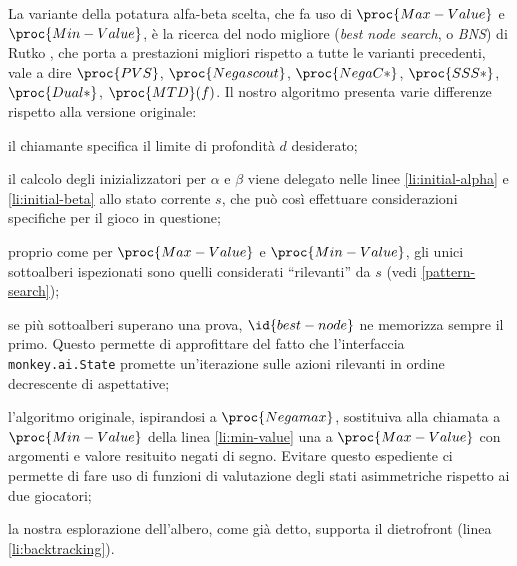 \documentclass{article}
\begin{document}
La variante della potatura alfa-beta scelta, che fa uso di $\proc{Max-Value}$ e
$\proc{Min-Value}$, è la ricerca del nodo migliore (\emph{best node search}, o
\emph{BNS}) di Rutko \cite{edseul.200009163084620110101}, che porta a
prestazioni migliori rispetto a tutte le varianti precedenti, vale a dire
$\proc{PVS}$, $\proc{Negascout}$, $\proc{NegaC*}$, $\proc{SSS*}$,
$\proc{Dual*}$, $\proc{MTD}(f)$. Il nostro algoritmo presenta varie differenze
rispetto alla versione originale:
\begin{itemize}
    \item il chiamante specifica il limite di profondità $d$ desiderato;
    \item il calcolo degli inizializzatori per $\alpha$ e $\beta$ viene delegato
      nelle linee \ref{li:initial-alpha} e \ref{li:initial-beta} allo stato
      corrente $s$, che può così effettuare considerazioni specifiche per il
      gioco in questione;
    \item proprio come per $\proc{Max-Value}$ e $\proc{Min-Value}$, gli unici
      sottoalberi ispezionati sono quelli considerati ``rilevanti'' da $s$ (vedi
      \ref{pattern-search});
    \begin{sloppypar}
    \item se più sottoalberi superano una prova, $\id{best-node}$ ne memorizza
      sempre il primo. Questo permette di approfittare del fatto che
      l'interfaccia \verb!monkey.ai.State! promette un'iterazione sulle azioni
      rilevanti in ordine decrescente di aspettative;
    \end{sloppypar}
    \item l'algoritmo originale, ispirandosi a $\proc{Negamax}$, sostituiva alla
      chiamata a $\proc{Min-Value}$ della linea \ref{li:min-value} una a
      $\proc{Max-Value}$ con argomenti e valore resituito negati di segno. 
      Evitare questo espediente ci permette di fare uso di funzioni di
      valutazione degli stati asimmetriche rispetto ai due giocatori;
    \item la nostra esplorazione dell'albero, come già detto, supporta il
      dietrofront (linea \ref{li:backtracking}).
\end{itemize}
\end{document}
